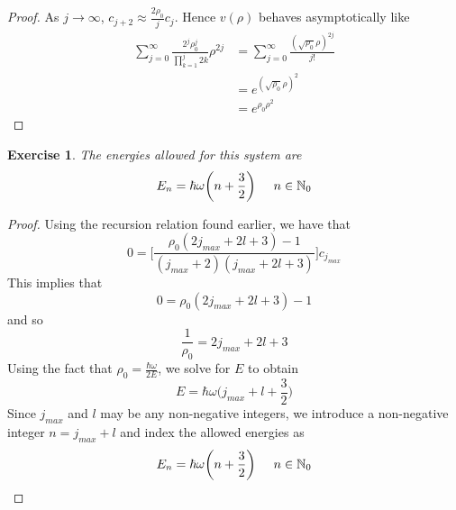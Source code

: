 \documentclass[12pt]{amsart}
\newtheorem{ex}[thm]{Exercise}
\newcommand{\om}{\omega}
\newcommand{\N}{\mathbb{N}}
\begin{document}
\begin{proof}
As $j \rightarrow \infty$, $c_{j+2} \approx \frac{2 \rho_0}{j}c_j$. Hence $v(\rho)$ behaves asymptotically like 
\begin{align*}
\sum_{j=0}^{\infty}\frac{2^j\rho_0^j}{\prod_{k=1}^j2k}\rho^{2j}
&= \sum_{j=0}^{\infty}\frac{(\sqrt{\rho_0} \rho)^{2j}}{j!}\\
&= e^{(\sqrt{\rho_0}\rho)^2}\\
&= e^{\rho_0 \rho^2}
\end{align*}
\end{proof}

\begin{ex}
The energies allowed for this system are $$E_n = \hbar \om \bigg(n+\frac{3}{2} \bigg) \hspace{.5cm}n \in \N_0$$
\end{ex}

\begin{proof}
Using the recursion relation found earlier, we have that $$0 = \bigg[ \frac{\rho_0(2j_{max}+2l+3)-1}{(j_{max}+2)(j_{max}+2l+3)}\bigg]c_{j_{max}} $$ This implies that $$0 = \rho_0(2j_{max}+2l+3)-1$$ and so $$\frac{1}{\rho_0} = 2j_{max} + 2l +3$$ Using the fact that $\rho_0 = \frac{\hbar \om}{2E}$, we solve for $E$ to obtain $$E = \hbar \om \bigg( j_{max} + l + \frac{3}{2}\bigg)$$ Since $j_{max}$ and $l$ may be any non-negative integers, we introduce a non-negative integer $n = j_{max}+l$ and index the allowed energies as $$E_n = \hbar \om\bigg(n+ \frac{3}{2} \bigg) \hspace{.5cm} n \in \N_0$$
\end{proof}
\end{document}
